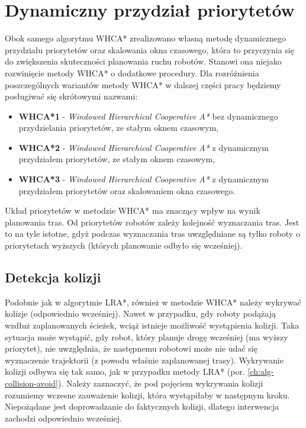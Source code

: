 \section{Dynamiczny przydział priorytetów}
\label{ch:alg-priorities-allocation}
Obok samego algorytmu WHCA* zrealizowano własną metodę dynamicznego przydziału priorytetów oraz skalowania okna czasowego, która to przyczynia się do zwiększenia skuteczności planowania ruchu robotów. Stanowi ona niejako rozwinięcie metody WHCA* o dodatkowe procedury.
Dla rozróżnienia poszczególnych wariantów metody WHCA* w dalszej części pracy będziemy posługiwać się skrótowymi nazwami:
\begin{itemize}
	\item {\bf WHCA*1} - {\it Windowed Hierarchical Cooperative A*} bez dynamicznego przydzielania priorytetów, ze stałym oknem czasowym,
	\item {\bf WHCA*2} - {\it Windowed Hierarchical Cooperative A*} z dynamicznym przydziałem priorytetów, ze stałym oknem czasowym,
	\item {\bf WHCA*3} - {\it Windowed Hierarchical Cooperative A*} z dynamicznym przydziałem priorytetów oraz skalowaniem okna czasowego.
\end{itemize}

Układ priorytetów w metodzie WHCA* ma znaczący wpływ na wynik planowania tras. Od priorytetów robotów zależy kolejność wyznaczania tras.
Jest to na tyle istotne, gdyż podczas wyznaczania tras uwzględniane są tylko roboty o priorytetach wyższych (których planowanie odbyło się wcześniej).

\subsection{Detekcja kolizji}
Podobnie jak w algorytmie LRA*, również w metodzie WHCA* należy wykrywać kolizje (odpowiednio wcześniej).
Nawet w przypadku, gdy roboty podążają wzdłuż zaplanowanych ścieżek, wciąż istnieje możliwość wystąpienia kolizji.
Taka sytuacja może wystąpić, gdy robot, który planuje drogę wcześniej (ma wyższy priorytet), nie uwzględnia, że następnemu robotowi może nie udać się wyznaczenie trajektorii (z powodu właśnie zaplanowanej trasy).
Wykrywanie kolizji odbywa się tak samo, jak w przypadku metody LRA* (por. \ref{ch:alg-collision-avoid}).
Należy zaznaczyć, że pod pojęciem wykrywania kolizji rozumiemy wczesne zauważenie kolizji, która wystąpiłaby w następnym kroku. Niepożądane jest doprowadzanie do faktycznych kolizji, dlatego interwencja zachodzi odpowiednio wcześniej.

